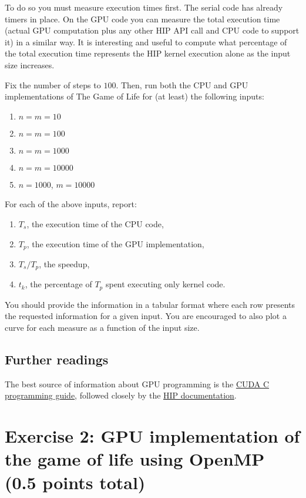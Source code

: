 \documentclass[a4paper, 11pt]{article}
\begin{document}
	To do so you must measure execution times first. The serial code has already timers in place. On the GPU code you can measure the total execution time (actual GPU computation plus any other HIP API call and CPU code to support it) in a similar way. It is interesting and useful to compute what percentage of the total execution time represents the HIP kernel execution alone as the input size increases.
	
	Fix the number of steps to $100$. Then, run both the CPU and GPU implementations of The Game of Life for (at least) the following inputs:
	\begin{enumerate}
		\item $n = m = 10$
		\item $n = m = 100$
		\item $n = m = 1000$
		\item $n = m = 10000$
		\item $n = 1000$, $m = 10000$
	\end{enumerate}
	
	\noindent For each of the above inputs, report:
	
	\begin{enumerate}
		\item $T_s$, the execution time of the CPU code,
		\item $T_p$, the execution time of the GPU implementation,
		\item $T_s/T_p$, the speedup,
		\item $t_k$, the percentage of $T_p$ spent executing only kernel code. 
	\end{enumerate}

You should provide the information in a tabular format where each row presents the requested information for a given input. You are encouraged to also plot a curve for each measure as a function of the input size.

\subsection{Further readings}

The best source of information about GPU programming is the \href{https://docs.nvidia.com/cuda/cuda-c-programming-guide/index.html }{CUDA C programming guide}, followed closely by the \href{https://rocm.docs.amd.com/projects/HIP/en/latest/}{HIP documentation}.

\section{Exercise 2: GPU implementation of the game of life using OpenMP (0.5 points total)}
   
\end{document}
